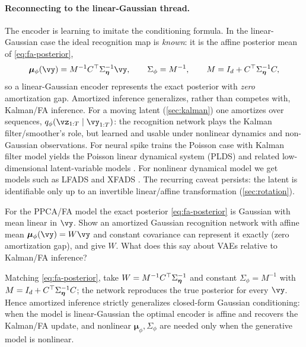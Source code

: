\documentclass[11pt]{article}
\theoremstyle{plain}
\theoremstyle{definition}
\theoremstyle{remark}
\theoremstyle{definition}
\newcommand{\veta}{\bm{\eta}}
\newcommand{\vmu}{\bm{\mu}}
\begin{document}
\paragraph{Reconnecting to the linear-Gaussian thread.} The encoder is learning to
imitate the conditioning formula. In the linear-Gaussian case the ideal recognition
map is \emph{known}: it is the affine posterior mean of \eqref{eq:fa-posterior},
\begin{equation}\label{eq:vae-lg}
    \vmu_{\phi}(\vy) = M^{-1}C\trp\Sigma_{\veta}^{-1}\vy, \qquad
    \Sigma_{\phi} = M^{-1}, \qquad M = I_d + C\trp\Sigma_{\veta}^{-1}C,
\end{equation}
so a linear-Gaussian encoder represents the exact posterior with \emph{zero}
amortization gap. Amortized inference generalizes, rather than competes with,
Kalman/FA inference. For a moving latent (\cref{sec:kalman}) one amortizes over
sequences, $q_{\phi}(\vz_{1:T}\mid\vy_{1:T})$: the recognition network plays the
Kalman filter/smoother's role, but learned and usable under nonlinear dynamics and
non-Gaussian observations.
For neural spike trains the Poisson case with Kalman filter model yields the Poisson linear dynamical system (PLDS)
and related low-dimensional latent-variable models \parencite{Macke2011-ep,Yu2009-qp,Pfau2013-oi,Buesing2013-ce}.
For nonlinear dynamical model we get models such as LFADS \parencite{Pandarinath2018-lfads} and XFADS \parencite{Dowling2024-xfads}.
The recurring caveat persists: the latent is identifiable only up to an invertible linear/affine transformation
(\cref{sec:rotation}).

\begin{exercise}
For the PPCA/FA model the exact posterior \eqref{eq:fa-posterior} is Gaussian with
mean linear in $\vy$. Show an amortized Gaussian recognition network with affine
mean $\vmu_{\phi}(\vy) = W\vy$ and constant covariance can represent it exactly
(zero amortization gap), and give $W$. What does this say about VAEs relative to
Kalman/FA inference?
\end{exercise}
\begin{solution}
Matching \eqref{eq:fa-posterior}, take $W = M^{-1}C\trp\Sigma_{\veta}^{-1}$ and
constant $\Sigma_{\phi} = M^{-1}$ with $M = I_d + C\trp\Sigma_{\veta}^{-1}C$; the
network reproduces the true posterior for every $\vy$. Hence amortized inference
strictly generalizes closed-form Gaussian conditioning: when the model is
linear-Gaussian the optimal encoder is affine and recovers the Kalman/FA update,
and nonlinear $\vmu_{\phi}, \Sigma_{\phi}$ are needed only when the generative
model is nonlinear.
\end{solution}
\end{document}
